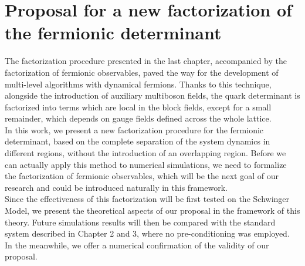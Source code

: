 \chapter{Proposal for a new factorization of the fermionic determinant}
\label{chap:newfact}

The factorization procedure presented in the last chapter, accompanied by the factorization of fermionic observables, paved the way for the development of multi-level algorithms with dynamical fermions. Thanks to this technique, alongside the introduction of auxiliary multiboson fields, the quark determinant is factorized into terms which are local in the block fields, except for a small remainder, which depends on gauge fields defined across the whole lattice.
\\ In this work, we present a new factorization procedure for the fermionic determinant, based on the complete separation of the system dynamics in different regions, without the introduction of an overlapping region. Before we can actually apply this method to numerical simulations, we need to formalize the factorization of fermionic observables, which will be the next goal of our research and could be introduced naturally in this framework.
\\ Since the effectiveness of this factorization will be first tested on the Schwinger Model, we present the theoretical aspects of our proposal in the framework of this theory. Future simulations results will then be compared with the standard system described in Chapter 2 and 3, where no pre-conditioning was employed. 
\\ In the meanwhile, we offer a numerical confirmation of the validity of our proposal.


